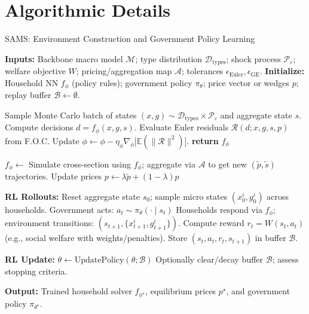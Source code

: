\documentclass[11pt]{article}
\begin{document}
\section{Algorithmic Details}
\begin{algorithm}[H]
\caption{SAMS: Environment Construction and Government Policy Learning}
\label{alg:sams}
\begin{algorithmic}[1]
\State \textbf{Inputs:} Backbone macro model $\mathcal{M}$; type distribution $\mathcal{D}_{\text{types}}$; shock process $\mathcal{P}_{\varepsilon}$; welfare objective $W$; pricing/aggregation map $\mathcal{A}$; tolerances $\epsilon_{\text{Euler}}, \epsilon_{\text{GE}}$.
\State \textbf{Initialize:} Household NN $f_{\phi}$ (policy rules); government policy $\pi_{\theta}$; price vector or wedges $p$; replay buffer $\mathcal{B}\leftarrow\emptyset$.

\Statex
{}
  \Repeat
    \State Sample Monte Carlo batch of states $(x,g)\sim \mathcal{D}_{\text{types}}\times \mathcal{P}_{\varepsilon}$ and aggregate state $s$.
    \State Compute decisions $d=f_{\phi}(x,g,s)$.
    \State Evaluate Euler residuals $\mathcal{R}(d; x,g,s,p)$ from F.O.C.
    \State Update $\phi \leftarrow \phi - \eta_{\phi}\nabla_{\phi}\big[\mathbb{E}(\|\mathcal{R}\|^2)\big]$.
  \State \textbf{return} $f_{\phi}$
\EndFunction

\Statex
\Repeat {}
  \State $f_{\phi}\leftarrow$ 
  \State Simulate cross-section using $f_{\phi}$; aggregate via $\mathcal{A}$ to get new $(\tilde{p}, \tilde{s})$ trajectories.
    \State Update prices $p \leftarrow \lambda \tilde{p} + (1-\lambda)p$ 
  \EndIf

  \State \textbf{RL Rollouts:}
    \State Reset aggregate state $s_0$; sample micro states $(x^i_0,g^i_0)$ across households.
      \State Government acts: $a_t \sim \pi_{\theta}(\cdot \mid s_t)$ 
      \State Households respond via $f_{\phi}$; environment transitions: $(s_{t+1}, \{x^i_{t+1},g^i_{t+1}\})$.
      \State Compute reward $r_t = W(s_t,a_t)$ (e.g., social welfare with weights/penalties).
      \State Store $(s_t,a_t,r_t,s_{t+1})$ in buffer $\mathcal{B}$.
    \EndFor
  \EndFor

  \State \textbf{RL Update:} $\theta \leftarrow \text{UpdatePolicy}(\theta;\mathcal{B})$ 
  \State Optionally clear/decay buffer $\mathcal{B}$; assess stopping criteria.

\State \textbf{Output:} Trained household solver $f_{\phi^\star}$, equilibrium prices $p^\star$, and government policy $\pi_{\theta^\star}$.
\end{algorithmic}
\end{algorithm}
\end{document}
